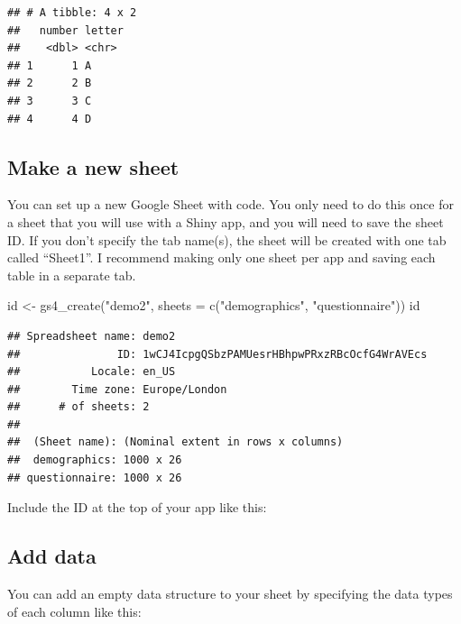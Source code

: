 \documentclass[
  oneside]{book}
\newenvironment{Shaded}{\begin{snugshade}}{\end{snugshade}}
\newcommand{\AttributeTok}[1]{\textcolor[rgb]{0.77,0.63,0.00}{#1}}
\newcommand{\FunctionTok}[1]{\textcolor[rgb]{0.00,0.00,0.00}{#1}}
\newcommand{\NormalTok}[1]{#1}
\newcommand{\OtherTok}[1]{\textcolor[rgb]{0.56,0.35,0.01}{#1}}
\newcommand{\StringTok}[1]{\textcolor[rgb]{0.31,0.60,0.02}{#1}}
\begin{document}
\begin{verbatim}
## # A tibble: 4 x 2
##   number letter
##    <dbl> <chr> 
## 1      1 A     
## 2      2 B     
## 3      3 C     
## 4      4 D
\end{verbatim}

\hypertarget{make-a-new-sheet}{%
\subsection{Make a new sheet}\label{make-a-new-sheet}}

You can set up a new Google Sheet with code. You only need to do this once for a sheet that you will use with a Shiny app, and you will need to save the sheet ID. If you don't specify the tab name(s), the sheet will be created with one tab called ``Sheet1''. I recommend making only one sheet per app and saving each table in a separate tab.

\begin{Shaded}
\begin{Highlighting}[]
\NormalTok{id }\OtherTok{\textless{}{-}} \FunctionTok{gs4\_create}\NormalTok{(}\StringTok{"demo2"}\NormalTok{, }\AttributeTok{sheets =} \FunctionTok{c}\NormalTok{(}\StringTok{"demographics"}\NormalTok{, }\StringTok{"questionnaire"}\NormalTok{))}
\NormalTok{id}
\end{Highlighting}
\end{Shaded}

\begin{verbatim}
## Spreadsheet name: demo2
##               ID: 1wCJ4IcpgQSbzPAMUesrHBhpwPRxzRBcOcfG4WrAVEcs
##           Locale: en_US
##        Time zone: Europe/London
##      # of sheets: 2
## 
##  (Sheet name): (Nominal extent in rows x columns)
##  demographics: 1000 x 26
## questionnaire: 1000 x 26
\end{verbatim}

Include the ID at the top of your app like this:

\hypertarget{add-data}{%
\subsection{Add data}\label{add-data}}

You can add an empty data structure to your sheet by specifying the data types of each column like this:
\end{document}
